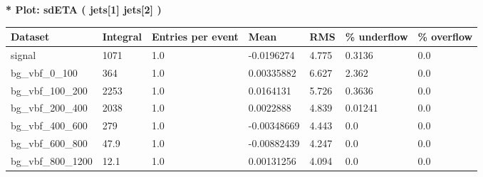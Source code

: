 \documentclass[a4paper, 10pt]{article}
\begin{document}
\textbf{* Plot: sdETA ( jets[1] jets[2] ) }\\
   \begin{table}[H]
  \begin{center}
    \begin{tabular}{|m{23.0mm}|m{23.0mm}|m{18.0mm}|m{19.0mm}|m{19.0mm}|m{19.0mm}|m{19.0mm}|}
      \hline
      {\cellcolor{yellow}         Dataset}& {\cellcolor{yellow}         Integral}& {\cellcolor{yellow}         Entries per event}& {\cellcolor{yellow}         Mean}& {\cellcolor{yellow}         RMS}& {\cellcolor{yellow}         \% underflow}& {\cellcolor{yellow}         \% overflow}\\
      \hline
      {\cellcolor{white}         signal}& {\cellcolor{white}         1071}& {\cellcolor{white}         1.0}& {\cellcolor{white}         -0.0196274}& {\cellcolor{white}         4.775}& {\cellcolor{green}         0.3136}& {\cellcolor{green}         0.0}\\
      \hline
      {\cellcolor{white}         bg\_vbf\_0\_100}& {\cellcolor{white}         364}& {\cellcolor{white}         1.0}& {\cellcolor{white}         0.00335882}& {\cellcolor{white}         6.627}& {\cellcolor{green}         2.362}& {\cellcolor{green}         0.0}\\
      \hline
      {\cellcolor{white}         bg\_vbf\_100\_200}& {\cellcolor{white}         2253}& {\cellcolor{white}         1.0}& {\cellcolor{white}         0.0164131}& {\cellcolor{white}         5.726}& {\cellcolor{green}         0.3636}& {\cellcolor{green}         0.0}\\
      \hline
      {\cellcolor{white}         bg\_vbf\_200\_400}& {\cellcolor{white}         2038}& {\cellcolor{white}         1.0}& {\cellcolor{white}         0.0022888}& {\cellcolor{white}         4.839}& {\cellcolor{green}         0.01241}& {\cellcolor{green}         0.0}\\
      \hline
      {\cellcolor{white}         bg\_vbf\_400\_600}& {\cellcolor{white}         279}& {\cellcolor{white}         1.0}& {\cellcolor{white}         -0.00348669}& {\cellcolor{white}         4.443}& {\cellcolor{green}         0.0}& {\cellcolor{green}         0.0}\\
      \hline
      {\cellcolor{white}         bg\_vbf\_600\_800}& {\cellcolor{white}         47.9}& {\cellcolor{white}         1.0}& {\cellcolor{white}         -0.00882439}& {\cellcolor{white}         4.247}& {\cellcolor{green}         0.0}& {\cellcolor{green}         0.0}\\
      \hline
      {\cellcolor{white}         bg\_vbf\_800\_1200}& {\cellcolor{white}         12.1}& {\cellcolor{white}         1.0}& {\cellcolor{white}         0.00131256}& {\cellcolor{white}         4.094}& {\cellcolor{green}         0.0}& {\cellcolor{green}         0.0}\\

\end{tabular}
\end{center}
\end{table}
\end{document}

